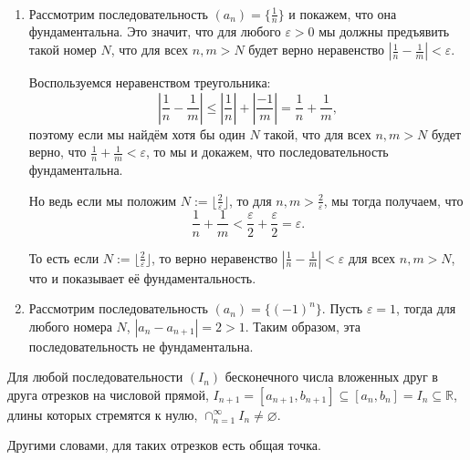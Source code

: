 \begin{example}~
    \begin{enumerate}
        \item Рассмотрим последовательность $(a_n) = \{\frac{1}{n}\}$ и покажем, что она фундаментальна. Это значит, что для любого $\varepsilon >0$ мы должны предъявить такой номер $N$, что для всех $n,m > N$ будет верно неравенство $|\frac{1}{n}  - \frac{1}{m}| < \varepsilon$.

        Воспользуемся неравенством треугольника:
        \[
          \left|\frac{1}{n}  - \frac{1}{m} \right| \le \left| \frac{1}{n}\right| + \left| \frac{-1}{m} \right| = \frac{1}{n} + \frac{1}{m},
        \]
        поэтому если мы найдём хотя бы один $N$ такой, что для всех $n,m >N$ будет верно, что $ \frac{1}{n} + \frac{1}{m} <\varepsilon$, то мы и докажем, что последовательность фундаментальна.

        Но ведь если мы положим $N:=\lfloor \frac{2}{\varepsilon} \rfloor$, то для $n,m > \frac{2}{\varepsilon}$, мы тогда получаем, что
        \[
         \frac{1}{n} + \frac{1}{m} < \frac{\varepsilon}{2} + \frac{\varepsilon}{2} = \varepsilon.
        \]

        То есть если $N:=\lfloor \frac{2}{\varepsilon} \rfloor$, то верно неравенство $|\frac{1}{n}  - \frac{1}{m}| < \varepsilon$ для всех $n,m >N$, что и показывает её фундаментальность.


        \item Рассмотрим последовательность $(a_n) = \{(-1)^n\}$. Пусть $\varepsilon = 1$, тогда для любого номера $N$, $|a_n - a_{n+1}| = 2 >1$. Таким образом, эта последовательность не фундаментальна.
    \end{enumerate}
\end{example}


\begin{lemma}\label{cap_of_intervals}
    Для любой последовательности $(I_n)$ бесконечного числа вложенных друг в друга отрезков на числовой прямой, \ie $I_{n+1} = [a_{n+1}, b_{n+1}] \subseteq [a_n, b_n] = I_n \subseteq \mathbb{R}$, длины которых стремятся к нулю, $\cap_{n=1}^\infty I_n \ne \varnothing.$
\end{lemma}

Другими словами, для таких отрезков есть общая точка.

